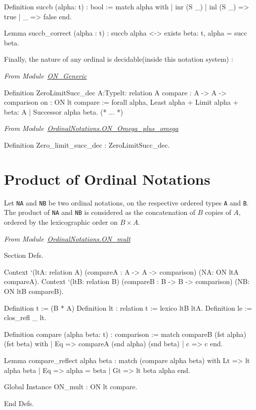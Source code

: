 \begin{Coqsrc}
Definition succb (alpha: t) : bool := match alpha with
                                 | inr (S  _) | inl (S _) => true
                                 | _ => false
                                 end.

Lemma succb_correct (alpha : t) :
    succb alpha <->  exists beta: t, alpha = succ beta.
\end{Coqsrc}


Finally, the nature of any ordinal is decidable(inside this notation system) :

\noindent\emph{From Module~\href{../theories/html/hydras.OrdinalNotations.ON_Generic.html}{ON\_Generic}}
\begin{Coqsrc}
  Definition ZeroLimitSucc_dec {A:Type}{lt: relation A}
           {compare : A -> A -> comparison}
           {on : ON lt compare} :=
  forall alpha,
    {Least alpha} +
    {Limit alpha} +
    {beta: A | Successor alpha beta}.
(* ... *)
\end{Coqsrc}

\noindent\emph{From Module~\href{../theories/html/hydras.OrdinalNotations.ON_Omega_plus_omega.html}{OrdinalNotations.ON\_Omega\_plus\_omega}}

\begin{Coqsrc}
Definition Zero_limit_succ_dec : ZeroLimitSucc_dec.
\end{Coqsrc}

\section{Product of Ordinal Notations}

Let \texttt{NA} and \texttt{NB} be two ordinal notations, on the respective  ordered types \texttt{A} and \texttt{B}. The product of \texttt{NA} and \texttt{NB} is considered as the concatenation of $B$ copies of $A$, ordered by the lexicographic order on $B\times A$.

\vspace{4pt}
\noindent
\emph{From Module~\href{../theories/html/hydras.OrdinalNotations.ON_mult.html}{OrdinalNotations.ON\_mult}}

\begin{Coqsrc}
Section Defs.

  Context `(ltA: relation A)
          (compareA : A -> A -> comparison)
          (NA: ON ltA compareA).
  Context `(ltB: relation B)
          (compareB : B -> B -> comparison)
          (NB: ON ltB compareB).

Definition t := (B * A)%
Definition lt : relation t := lexico ltB ltA.
Definition le := clos_refl _ lt.

Definition compare (alpha beta: t) : comparison :=
  match compareB (fst alpha) (fst beta) with
  |  Eq => compareA (snd alpha) (snd beta)
  | c => c
  end.

Lemma compare_reflect alpha beta :
  match (compare alpha beta)
  with
    Lt => lt alpha  beta
  | Eq => alpha = beta
  | Gt => lt beta  alpha
  end.

Global Instance ON_mult : ON lt compare.

End Defs.
\end{Coqsrc}

